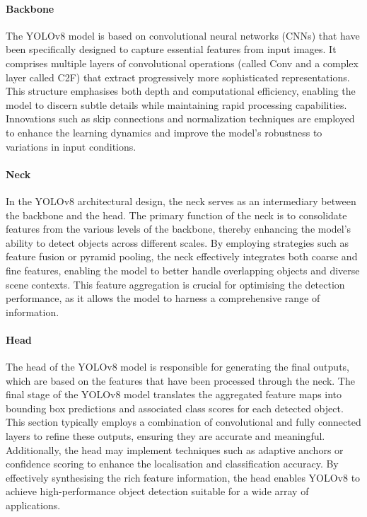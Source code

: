 \paragraph{Backbone}\label{par:backbone}
The YOLOv8 model is based on convolutional neural networks (CNNs) that have been specifically designed to capture essential features from input images.
It comprises multiple layers of convolutional operations (called Conv and a complex layer called C2F)
that extract progressively more sophisticated representations.
This structure emphasises both depth and computational efficiency,
enabling the model to discern subtle details while maintaining rapid processing capabilities.
Innovations such as skip connections and normalization techniques are employed to enhance the learning dynamics and improve the model's robustness to variations in input conditions.

\paragraph{Neck}\label{par:neck}
In the YOLOv8 architectural design, the neck serves as an intermediary between the backbone and the head.
The primary function of the neck is to consolidate features from the various levels of the backbone,
thereby enhancing the model's ability to detect objects across different scales.
By employing strategies such as feature fusion or pyramid pooling,
the neck effectively integrates both coarse and fine features,
enabling the model to better handle overlapping objects and diverse scene contexts.
This feature aggregation is crucial for optimising the detection performance,
as it allows the model to harness a comprehensive range of information.



\paragraph{Head}\label{par:head}
The head of the YOLOv8 model is responsible for generating the final outputs,
which are based on the features that have been processed through the neck.
The final stage of the YOLOv8 model translates the aggregated feature maps into bounding box predictions and associated class scores for each detected object.
This section typically employs a combination of convolutional and fully connected layers to refine these outputs,
ensuring they are accurate and meaningful.
Additionally, the head may implement techniques such as adaptive anchors or
confidence scoring to enhance the localisation and classification accuracy.
By effectively synthesising the rich feature information, the head enables YOLOv8 to achieve high-performance object detection suitable for a wide array of applications.


